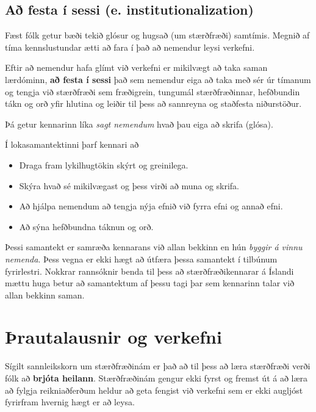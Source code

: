\documentclass[
  icelandic,
]{book}
\providecommand{\tightlist}{%
  \setlength{\itemsep}{0pt}\setlength{\parskip}{0pt}}
\theoremstyle{definition}
\theoremstyle{definition}
\theoremstyle{definition}
\theoremstyle{definition}
\theoremstyle{remark}
\begin{document}
\section{Að festa í sessi (e. institutionalization)}\label{festa-sessi}

Fæst fólk getur bæði tekið glósur og hugsað (um stærðfræði) samtímis. Megnið af tíma kennslustundar ætti að fara í það að nemendur leysi verkefni.

Eftir að nemendur hafa glímt við verkefni er mikilvægt að taka saman lærdóminn, \textbf{að festa í sessi} það sem nemendur eiga að taka með sér úr tímanum og tengja við stærðfræði sem fræðigrein, tungumál stærðfræðinnar, hefðbundin tákn og orð yfir hlutina og leiðir til þess að sannreyna og staðfesta niðurstöður.

Þá getur kennarinn líka \emph{sagt nemendum} hvað þau eiga að skrifa (glósa).

Í lokasamantektinni þarf kennari að

\begin{itemize}
\tightlist
\item
  Draga fram lykilhugtökin skýrt og greinilega.
\item
  Skýra hvað sé mikilvægast og þess virði að muna og skrifa.
\item
  Að hjálpa nemendum að tengja nýja efnið við fyrra efni og annað efni.
\item
  Að sýna hefðbundna táknun og orð.
\end{itemize}

Þessi samantekt er samræða kennarans við allan bekkinn en hún \emph{byggir á vinnu nemenda}. Þess vegna er ekki hægt að útfæra þessa samantekt í tilbúnum fyrirlestri. Nokkrar rannsóknir benda til þess að stærðfræðikennarar á Íslandi mættu huga betur að samantektum af þessu tagi \autocite{oskarsdottir2014} \autocite{savola2008} þar sem kennarinn talar við allan bekkinn saman.

\chapter{Þrautalausnir og verkefni}\label{thrautir-verkefni}

Sígilt sannleikskorn um stærðfræðinám er það að til þess að læra stærðfræði verði fólk að \textbf{brjóta heilann}. Stærðfræðinám gengur ekki fyrst og fremst út á að læra að fylgja reikniaðferðum heldur að geta fengist við verkefni sem er ekki augljóst fyrirfram hvernig hægt er að leysa.
\end{document}
